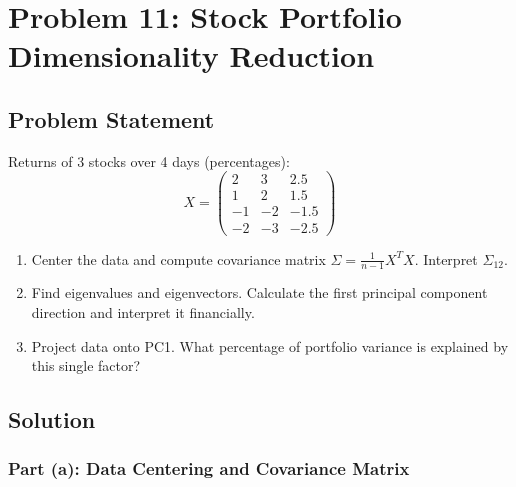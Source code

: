 \documentclass[12pt]{article}
\begin{document}
\section{Problem 11: Stock Portfolio Dimensionality Reduction}

\subsection{Problem Statement}

Returns of 3 stocks over 4 days (percentages):
\[
X = \begin{pmatrix}
2 & 3 & 2.5 \\
1 & 2 & 1.5 \\
-1 & -2 & -1.5 \\
-2 & -3 & -2.5
\end{pmatrix}
\]

\begin{enumerate}
\item[(a)] Center the data and compute covariance matrix $\Sigma = \frac{1}{n-1}X^TX$. Interpret $\Sigma_{12}$.
\item[(b)] Find eigenvalues and eigenvectors. Calculate the first principal component direction and interpret it financially.
\item[(c)] Project data onto PC1. What percentage of portfolio variance is explained by this single factor?
\end{enumerate}

\subsection{Solution}

\subsubsection{Part (a): Data Centering and Covariance Matrix}
\end{document}
